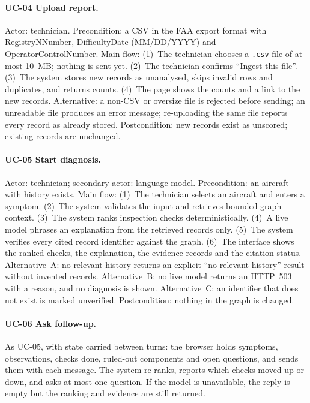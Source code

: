 \paragraph{UC-04 Upload report.}
Actor: technician. Precondition: a CSV in the FAA export format with RegistryNNumber, DifficultyDate (MM/DD/YYYY) and OperatorControlNumber. Main flow: (1)~The technician chooses a \texttt{.csv} file of at most 10~MB; nothing is sent yet. (2)~The technician confirms ``Ingest this file''. (3)~The system stores new records as unanalysed, skips invalid rows and duplicates, and returns counts. (4)~The page shows the counts and a link to the new records. Alternative: a non-CSV or oversize file is rejected before sending; an unreadable file produces an error message; re-uploading the same file reports every record as already stored. Postcondition: new records exist as unscored; existing records are unchanged.

\paragraph{UC-05 Start diagnosis.}
Actor: technician; secondary actor: language model. Precondition: an aircraft with history exists. Main flow: (1)~The technician selects an aircraft and enters a symptom. (2)~The system validates the input and retrieves bounded graph context. (3)~The system ranks inspection checks deterministically. (4)~A live model phrases an explanation from the retrieved records only. (5)~The system verifies every cited record identifier against the graph. (6)~The interface shows the ranked checks, the explanation, the evidence records and the citation status. Alternative~A: no relevant history returns an explicit ``no relevant history'' result without invented records. Alternative~B: no live model returns an HTTP~503 with a reason, and no diagnosis is shown. Alternative~C: an identifier that does not exist is marked unverified. Postcondition: nothing in the graph is changed.

\paragraph{UC-06 Ask follow-up.}
As UC-05, with state carried between turns: the browser holds symptoms, observations, checks done, ruled-out components and open questions, and sends them with each message. The system re-ranks, reports which checks moved up or down, and asks at most one question. If the model is unavailable, the reply is empty but the ranking and evidence are still returned.

